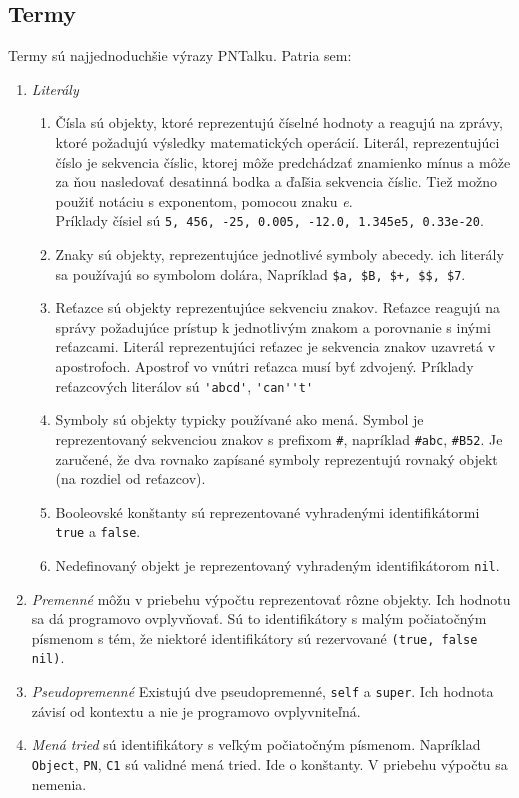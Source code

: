 \subsection{Termy}
Termy sú najjednoduchšie výrazy PNTalku. Patria sem:
\begin{enumerate}
	\item \emph{Literály}
	\begin{enumerate}
		\item Čísla sú objekty, ktoré reprezentujú číselné hodnoty a reagujú na zprávy, ktoré požadujú výsledky matematických operácií. Literál, reprezentujúci číslo je sekvencia číslic, ktorej môže predchádzať znamienko mínus a môže za ňou nasledovať desatinná bodka a ďaľšia sekvencia číslic. Tiež možno použiť notáciu s exponentom, pomocou znaku \emph{e}. \\Príklady čísiel sú  \lstinline{5, 456, -25, 0.005, -12.0, 1.345e5, 0.33e-20}.
		\item Znaky sú objekty, reprezentujúce jednotlivé symboly abecedy. ich literály
		sa používajú so symbolom dolára, Napríklad \lstinline{$a, $B, $+, $$, $7}.
		\item Reťazce sú objekty reprezentujúce sekvenciu znakov. Reťazce reagujú na správy požadujúce prístup k jednotlivým znakom a porovnanie s inými reťazcami. Literál reprezentujúci reťazec je sekvencia znakov uzavretá v apostrofoch. Apostrof vo vnútri reťazca musí byť zdvojený. Príklady reťazcových literálov sú \lstinline{'abcd'}, \lstinline{'can''t'}
		\item Symboly sú objekty typicky používané ako mená. Symbol je reprezentovaný sekvenciou znakov s prefixom \lstinline{#}, napríklad \lstinline{#abc}, \lstinline{#B52}. Je zaručené, že dva rovnako zapísané symboly reprezentujú rovnaký objekt (na rozdiel od reťazcov).
		\item Booleovské konštanty sú reprezentované vyhradenými identifikátormi \lstinline{true} a \lstinline{false}.
		\item Nedefinovaný objekt je reprezentovaný vyhradeným identifikátorom \lstinline{nil}.
	\end{enumerate}
	\item \emph{Premenné} môžu v priebehu výpočtu reprezentovať rôzne objekty. Ich hodnotu sa dá programovo ovplyvňovať. Sú to identifikátory s malým počiatočným písmenom s tém, že niektoré identifikátory sú rezervované \lstinline{(true, false nil)}.
	\item \emph{Pseudopremenné} Existujú dve pseudopremenné, \lstinline{self} a \lstinline{super}. Ich hodnota závisí od kontextu a nie je programovo ovplyvniteľná.
	\item \emph{Mená tried} sú identifikátory s veľkým počiatočným písmenom. Napríklad \lstinline{Object}, \lstinline{PN}, \lstinline{C1} sú validné mená tried. Ide o konštanty. V priebehu výpočtu sa nemenia.
\end{enumerate}


